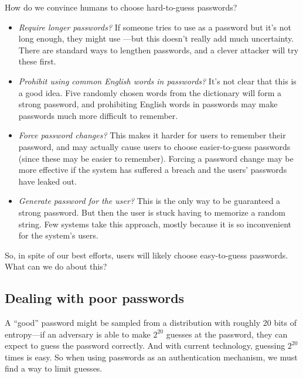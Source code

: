 How do we convince humans to choose hard-to-guess passwords? 

\begin{itemize}
  \item \emph{Require longer passwords?} If someone tries to use 
     as a password but it's not long
    enough, they might use ---but
    this doesn't really add much uncertainty.
    There are standard ways to lengthen passwords,
    and a clever attacker will try these first.
  \item \emph{Prohibit using common English words in passwords?}
    It's not clear that this is a good idea.
    Five randomly chosen words from the dictionary will
    form a strong password, and prohibiting English words
    in passwords may make passwords much more difficult to remember.
      
  \item \emph{Force password changes?}
    This makes it harder for users to remember their password, and
    may actually cause users to choose easier-to-guess passwords
    (since these may be easier to remember).
    Forcing a password change may be more effective if the system has
    suffered a breach and the users' passwords have leaked out.

  \item \emph{Generate password for the user?} This is the only way
    to be guaranteed a strong password. But then the user is stuck
    having to memorize a random string.
    Few systems take this approach, mostly because it is so inconvenient
    for the system's users.

\end{itemize}

So, in spite of our best efforts, users will likely choose
easy-to-guess passwords.
What can we do about this?

\subsection{Dealing with poor passwords}
A ``good'' password might be sampled from a distribution with roughly
20 bits of 
entropy---if an adversary is able to make $2^{20}$ guesses
at the password, they can expect to guess the password correctly.
And with current technology, guessing $2^{20}$ times is easy.
So when using passwords as an authentication mechanism,
we must find a way to limit guesses. 

